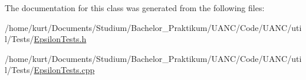 The documentation for this class was generated from the following files\+:\begin{DoxyCompactItemize}
\item 
/home/kurt/\+Documents/\+Studium/\+Bachelor\+\_\+\+Praktikum/\+U\+A\+N\+C/\+Code/\+U\+A\+N\+C/util/\+Tests/\hyperlink{_epsilon_tests_8h}{Epsilon\+Tests.\+h}\item 
/home/kurt/\+Documents/\+Studium/\+Bachelor\+\_\+\+Praktikum/\+U\+A\+N\+C/\+Code/\+U\+A\+N\+C/util/\+Tests/\hyperlink{_epsilon_tests_8cpp}{Epsilon\+Tests.\+cpp}\end{DoxyCompactItemize}
